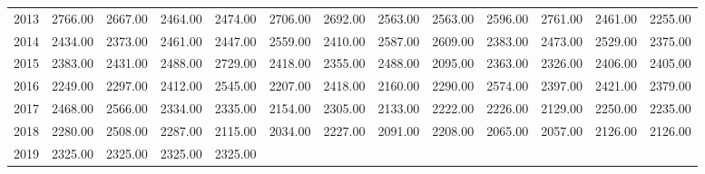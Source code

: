 \begin{longtable}{rrrrrrrrrrrrr}
  2013 & 2766.00 & 2667.00 & 2464.00 & 2474.00 & 2706.00 & 2692.00 & 2563.00 & 2563.00 & 2596.00 & 2761.00 & 2461.00 & 2255.00 \\ 
  2014 & 2434.00 & 2373.00 & 2461.00 & 2447.00 & 2559.00 & 2410.00 & 2587.00 & 2609.00 & 2383.00 & 2473.00 & 2529.00 & 2375.00 \\ 
  2015 & 2383.00 & 2431.00 & 2488.00 & 2729.00 & 2418.00 & 2355.00 & 2488.00 & 2095.00 & 2363.00 & 2326.00 & 2406.00 & 2405.00 \\ 
  2016 & 2249.00 & 2297.00 & 2412.00 & 2545.00 & 2207.00 & 2418.00 & 2160.00 & 2290.00 & 2574.00 & 2397.00 & 2421.00 & 2379.00 \\ 
  2017 & 2468.00 & 2566.00 & 2334.00 & 2335.00 & 2154.00 & 2305.00 & 2133.00 & 2222.00 & 2226.00 & 2129.00 & 2250.00 & 2235.00 \\ 
  2018 & 2280.00 & 2508.00 & 2287.00 & 2115.00 & 2034.00 & 2227.00 & 2091.00 & 2208.00 & 2065.00 & 2057.00 & 2126.00 & 2126.00 \\ 
  2019 & 2325.00 & 2325.00 & 2325.00 & 2325.00 &  &  &  &  &  &  &  &  \\ 
   \hline
\hline
\end{longtable}
